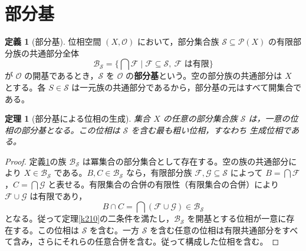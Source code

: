 \documentclass[a5paper,10pt,dvipdfmx]{jsarticle}
\theoremstyle{definition}
\newtheorem{defn}[ruledef]{定義}
\theoremstyle{plain}
\newtheorem{thm}[ruledef]{定理}
\newcommand{\Pow}{\mathcal{P}}
\newcommand{\GenronRefText}[2]{#2}
\begin{document}
\section{部分基}
\begin{defn}[部分基]\label{k212}
位相空間 $(X,\mathcal O)$ において，部分集合族 $\mathcal S\subseteq\Pow(X)$ の有限部分族の共通部分全体
\[
 \mathcal B_{\mathcal S}=
 \{\bigcap\mathcal F\mid
 \mathcal F\subseteq\mathcal S,\ \mathcal F\text{ は有限}\}
\]
が $\mathcal O$ の開基であるとき，$\mathcal S$ を $\mathcal O$ の\textbf{部分基}という。空の部分族の共通部分は $X$ とする。各 $S\in\mathcal S$ は一元族の共通部分であるから，部分基の元はすべて開集合である。
\end{defn}
\begin{thm}[部分基による位相の生成]\label{k213}
集合 $X$ の任意の部分集合族 $\mathcal S$ は，一意の位相の部分基となる。この位相は $\mathcal S$ を含む最も粗い位相，すなわち \GenronRefText{K-000154}{生成位相}である。
\end{thm}
\begin{proof}
定義\ref{k212}の族 $\mathcal B_{\mathcal S}$ は冪集合の部分集合として存在する。空の族の共通部分により $X\in\mathcal B_{\mathcal S}$ である。$B,C\in\mathcal B_{\mathcal S}$ なら，有限部分族 $\mathcal F,\mathcal G\subseteq\mathcal S$ によって $B=\bigcap\mathcal F$，$C=\bigcap\mathcal G$ と表せる。有限集合の合併の有限性（\GenronRefText{K-000116}{有限集合の合併}）により $\mathcal F\cup\mathcal G$ は有限であり，
\[
 B\cap C=\bigcap(\mathcal F\cup\mathcal G)
       \in\mathcal B_{\mathcal S}
\]
となる。従って定理\ref{k210}の二条件を満たし，$\mathcal B_{\mathcal S}$ を開基とする位相が一意に存在する。この位相は $\mathcal S$ を含む。一方 $\mathcal S$ を含む任意の位相は有限共通部分をすべて含み，さらにそれらの任意合併を含む。従って構成した位相を含む。
\end{proof}
\end{document}
